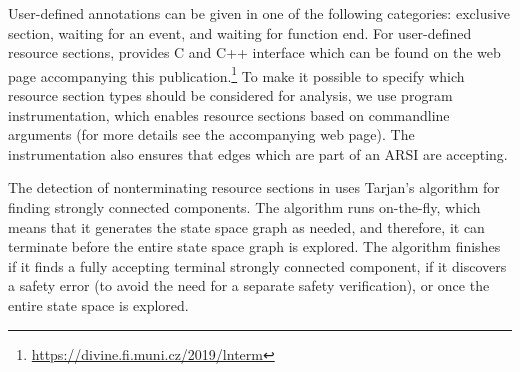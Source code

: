 User-defined annotations can be given in one of the following categories: exclusive section,
 waiting for an event, and
 waiting for function end.
For user-defined resource sections, \divine provides C and C++ interface which can be found on the web page accompanying this publication.\footnote{\url{https://divine.fi.muni.cz/2019/lnterm}}
To make it possible to specify which resource section types should be considered
for analysis, we use program instrumentation, which enables resource sections
based on commandline arguments (for more details see the accompanying web page).
The instrumentation also ensures that edges which are part of an ARSI are accepting.

The detection of nonterminating resource sections in \divine uses Tarjan's algorithm for finding strongly connected components.
The algorithm runs on-the-fly, which means that it generates the state space
graph as needed, and therefore, it can terminate before the entire state space graph is explored.
The algorithm finishes if it finds a fully accepting terminal strongly connected
component, if it discovers a safety error (to avoid the need for a separate
safety verification), or once the entire state space is explored.
